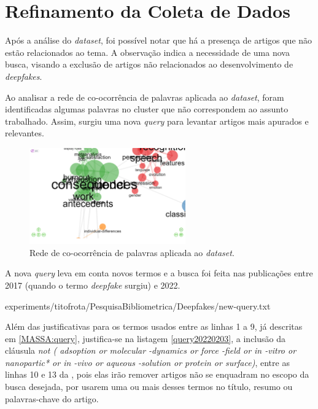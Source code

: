 \section{Refinamento da Coleta de Dados}

Após a análise do \textit{dataset}, foi possível notar que há a presença de artigos que não estão relacionados ao tema. A observação indica a necessidade de uma nova busca, visando a exclusão de artigos não relacionados ao desenvolvimento de \textit{deepfakes}.

Ao analisar a rede de co-ocorrência de palavras aplicada ao \textit{dataset}, foram identificadas algumas palavras no cluster que não correspondem ao assunto trabalhado. Assim, surgiu uma nova \textit{query} para levantar artigos mais apurados e relevantes.

\begin{figure}[htp]
    \centering
    \includegraphics[width=0.6\textwidth]{experiments/titofrota/PesquisaBibliometrica/Deepfakes/co-ocurrence.png}
    \caption{Rede de co-ocorrência de palavras aplicada ao \textit{dataset}.}
    \label{fig:DEEPFAKES@titofrota:redecoocorrencia}
\end{figure}

A nova \textit{query} leva em conta novos termos e a busca foi feita nas publicações entre 2017 (quando o termo \textit{deepfake} surgiu) e 2022.


{experiments/titofrota/PesquisaBibliometrica/Deepfakes/new-query.txt}


Além das justificativas para os termos usados entre as linhas 1 a 9, já descritas em \ref{MASSA:query},  justifica-se na listagem \ref{query20220203}, a inclusão da cláusula \textit{not (
 adsoption or molecular -dynamics or force -field
 or in -vitro or nanopartic* or in -vivo
 or aqueous -solution or protein or surface)}, entre as linhas 10 e 13 da \query, pois elas irão remover artigos não se enquadram no escopo da busca desejada, por usarem uma ou mais desses termos no título, resumo ou palavras-chave do artigo.
 
